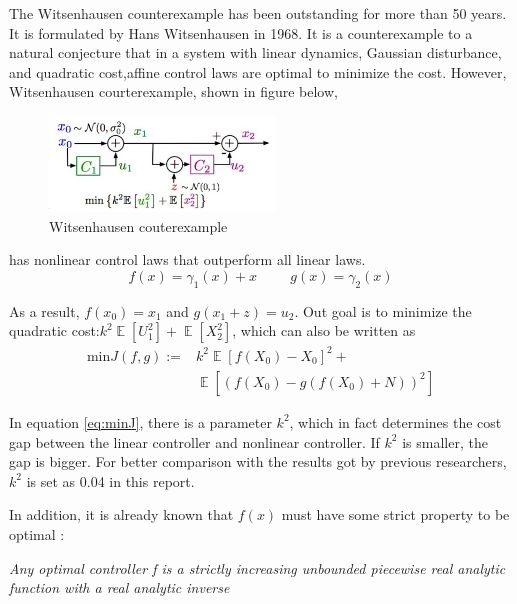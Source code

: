 \documentclass[conference,compsoc]{IEEEtran}
\DeclareMathOperator{\E}{\mathbb{E}}
\begin{document}
The Witsenhausen counterexample has been outstanding for more than 50 years. It is formulated by Hans Witsenhausen in 1968.\cite{witsenhausen1968counterexample} It is a counterexample to a natural conjecture that in a system with linear dynamics, Gaussian disturbance, and quadratic cost,affine control laws are optimal to minimize the cost. However, Witsenhausen courterexample, shown in figure below,
\begin{figure}[htp]
    \centering
    \includegraphics[width=6cm]{images/Wits_definition.png}
    \caption{Witsenhausen couterexample}
    \label{fig:definition}
\end{figure}
has nonlinear control laws that outperform all linear laws.
\begin{equation}
    f(x)=\gamma_1(x)+x \hspace{1cm} g(x)=\gamma_2(x)
\end{equation}

As a result, $f(x_0)=x_1$ and $g(x_1+z)=u_2$. Out goal is to minimize the quadratic cost:$k^{2} \E [U_1^{2}]+\E[X_2^{2}]$, which can also be written as 
\begin{equation}\label{eq:minJ}
\begin{aligned}
\mathrm{min}J(f,g):=&k^{2}\E[f(X_0)-X_0]^{2}+\\
&\E[(f(X_0)-g(f(X_0)+N))^{2}]
\end{aligned}
\end{equation}

In equation \eqref{eq:minJ}, there is a parameter $k^2$, which in fact determines the cost gap between the linear controller and nonlinear controller\cite{baglietto2001numerical}. If $k^2$ is smaller, the gap is bigger. For better comparison with the results got by previous researchers, $k^2$ is set as 0.04 in this report.

In addition, it is already known that $f(x)$ must have some strict property to be optimal \cite{wu2011witsenhausen} :\\
\begin{adjustwidth}{1cm}{}
\textbullet \textit{Any optimal controller f is a strictly increasing unbounded piecewise real analytic function with a real analytic inverse}
\end{adjustwidth}
\end{document}
